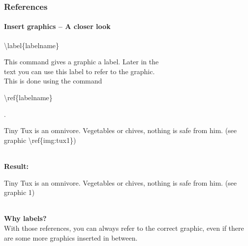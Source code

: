 
\begin{frame}
\frametitle{References}
\framesubtitle{Insert graphics – A closer look}
\begin{tabbing}
\begin{ttfamily}\color{nounibaredI}\textbackslash label\color{black}\{labelname\}\end{ttfamily} \=This command gives
a graphic a label. Later in the\\\> text you can use this label to refer to the graphic.\\
\> This is done using the command
\begin{ttfamily}\color{nounibaredI}\textbackslash ref\color{black}\{labelname\}\end{ttfamily}.
\end{tabbing}
\begin{ttfamily}Tiny Tux is an omnivore. Vegetables or
chives, nothing is safe from him. (see graphic
\color{nounibaredI}\textbackslash ref\color{black}\{img:tux1\})\end{ttfamily}\\[3mm]
\textbf{Result:}\\[3mm]
\begin{minipage}{\textwidth}\begin{rm}
Tiny Tux is an omnivore. Vegetables or
chives, nothing is safe from him. (see graphic
1)\end{rm} \end{minipage}\\[3mm]
\textbf{Why labels?}\\
With those references, you can always refer to the correct graphic, even if there are some more graphics inserted in between.
\end{frame}
